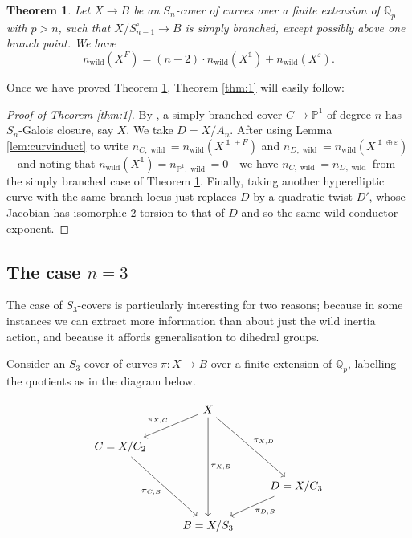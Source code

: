 \documentclass[12pt]{amsart}
\newtheorem{theorem}{Theorem}[section]
\theoremstyle{definition}
\theoremstyle{remark}
\newcommand{\eps}{\varepsilon}
\newcommand{\QQ}{\mathbb{Q}}
\newcommand{\Proj}{\mathbb{P}}
\DeclareMathOperator{\wild}{wild}
\DeclareMathOperator{\one}{\mathds{1}}
\begin{document}
\begin{theorem}\label{thm:Sn_main}
    Let $X\to B$ be an $S_n$-cover of curves over a finite extension of $\QQ_p$ with $p>n$, such that $X/S_{n-1}^\circ\to B$ is simply branched, except possibly above one branch point. We have
    \[n_{\wild}(X^{F})=(n-2)\cdot n_{\wild}(X^{\one})+n_{\wild}(X^\eps).\]
\end{theorem}

Once we have proved Theorem \ref{thm:Sn_main}, Theorem \ref{thm:1} will easily follow:

\begin{proof}[Proof of Theorem \ref{thm:1}]
    By \cite[Corollary 3.2]{BKP2024}, a simply branched cover $C\to\Proj^1$ of degree $n$ has $S_n$-Galois closure, say $X$. We take $D=X/A_n$. After using Lemma \ref{lem:curvinduct} to write $n_{C,\wild}=n_{\wild}(X^{\one+F})$ and $n_{D,\wild}=n_{\wild}(X^{\one\oplus\eps})$---and noting that $n_{\wild}(X^{\one})=n_{\Proj^1,\wild}=0$---we have $n_{C,\wild}=n_{D,\wild}$ from the simply branched case of Theorem \ref{thm:Sn_main}. Finally, taking another hyperelliptic curve with the same branch locus just replaces $D$ by a quadratic twist $D'$, whose Jacobian has isomorphic $2$-torsion to that of $D$ and so the same wild conductor exponent. 
\end{proof}


\subsection{The case $n=3$}

The case of $S_3$-covers is particularly interesting for two reasons; because in some instances we can extract more information than about just the wild inertia action, and because it affords generalisation to dihedral groups.

Consider an $S_3$-cover of curves $\pi: X \to B$ over a finite extension of $\QQ_p$, labelling the quotients as in the diagram below.

\[\begin{tikzcd}
	& X \\
	{C=X/C_2} \\
	&& {D=X/C_3} \\
	& {B=X/S_3}
	\arrow["{\pi_{X,C}}"', from=1-2, to=2-1]
	\arrow["{\pi_{X,D}}", from=1-2, to=3-3]
	\arrow["{\pi_{X,B}}", from=1-2, to=4-2]
	\arrow["{\pi_{C,B}}"', from=2-1, to=4-2]
	\arrow["{\pi_{D,B}}", from=3-3, to=4-2]
\end{tikzcd}\]
\end{document}
